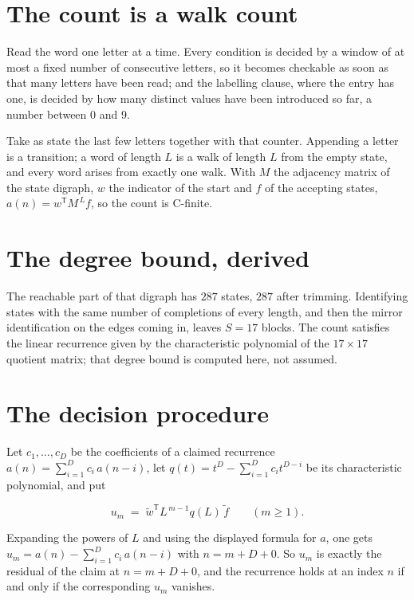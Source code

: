\documentclass[11pt]{article}
\theoremstyle{definition}
\begin{document}
\section{The count is a walk count}

Read the word one letter at a time. Every condition is decided by a window of at most a fixed number of consecutive letters, so it becomes checkable as soon as that many letters have been read; and the labelling clause, where the entry has one, is decided by how many distinct values have been introduced so far, a number between $0$ and 9.

Take as state the last few letters together with that counter. Appending a letter is a transition; a word of length $L$ is a walk of length $L$ from the empty state, and every word arises from exactly one walk. With $M$ the adjacency matrix of the state digraph, $w$ the indicator of the start and $f$ of the accepting states, $a(n) = w^{\mathsf T}M^{\,L}f$, so the count is C-finite.

\section{The degree bound, derived}

The reachable part of that digraph has $287$ states, $287$ after trimming. Identifying states with the same number of completions of every length, and then the mirror identification on the edges coming in, leaves $S = 17$ blocks. The count satisfies the linear recurrence given by the characteristic polynomial of the $17\times17$ quotient matrix; that degree bound is computed here, not assumed.

\section{The decision procedure}

Let $c_1,\dots,c_D$ be the coefficients of a claimed recurrence $a(n) = \sum_{i=1}^{D} c_i\,a(n-i)$, let $q(t) = t^{D} - \sum_{i=1}^{D} c_i t^{D-i}$ be its characteristic polynomial, and put

\[u_m \;=\; \tilde w^{\mathsf T} L^{\,m-1} q(L)\,\tilde f \qquad (m \ge 1).\]

Expanding the powers of $L$ and using the displayed formula for $a$, one gets $u_m = a(n) - \sum_{i=1}^{D} c_i\,a(n-i)$ with $n = m + D + 0$. So $u_m$ is exactly the residual of the claim at $n = m + D + 0$, and the recurrence holds at an index $n$ if and only if the corresponding $u_m$ vanishes.
\end{document}
